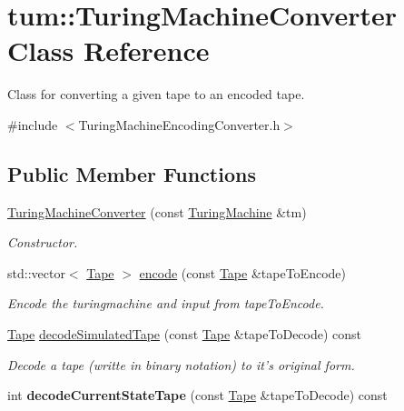 \hypertarget{classtum_1_1_turing_machine_converter}{\section{tum\-:\-:\-Turing\-Machine\-Converter \-Class \-Reference}
\label{classtum_1_1_turing_machine_converter}
}


\-Class for converting a given tape to an encoded tape.  




{\ttfamily \#include $<$\-Turing\-Machine\-Encoding\-Converter.\-h$>$}

\subsection*{\-Public \-Member \-Functions}
\begin{DoxyCompactItemize}
\item 
\hyperlink{classtum_1_1_turing_machine_converter_a907cba55e98213f451c7b66a8d188c03}{\-Turing\-Machine\-Converter} (const \hyperlink{classtum_1_1_turing_machine}{\-Turing\-Machine} \&tm)
\begin{DoxyCompactList}\small\item\em \-Constructor. \end{DoxyCompactList}\item 
std\-::vector$<$ \hyperlink{classtum_1_1_tape}{\-Tape} $>$ \hyperlink{classtum_1_1_turing_machine_converter_a86d87e7429fdd61dcc067fb85d3e8822}{encode} (const \hyperlink{classtum_1_1_tape}{\-Tape} \&tape\-To\-Encode)
\begin{DoxyCompactList}\small\item\em \-Encode the turingmachine and input from {\ttfamily tape\-To\-Encode}. \end{DoxyCompactList}\item 
\hyperlink{classtum_1_1_tape}{\-Tape} \hyperlink{classtum_1_1_turing_machine_converter_af94296ffc5b19f21daa4f3505f2dec8b}{decode\-Simulated\-Tape} (const \hyperlink{classtum_1_1_tape}{\-Tape} \&tape\-To\-Decode) const 
\begin{DoxyCompactList}\small\item\em \-Decode a tape (writte in binary notation) to it's original form. \end{DoxyCompactList}\item 
\hypertarget{classtum_1_1_turing_machine_converter_a94c00350ec612eb57960241ce3ed3c60}{int {\bfseries decode\-Current\-State\-Tape} (const \hyperlink{classtum_1_1_tape}{\-Tape} \&tape\-To\-Decode) const }\label{classtum_1_1_turing_machine_converter_a94c00350ec612eb57960241ce3ed3c60}

\end{DoxyCompactItemize}


